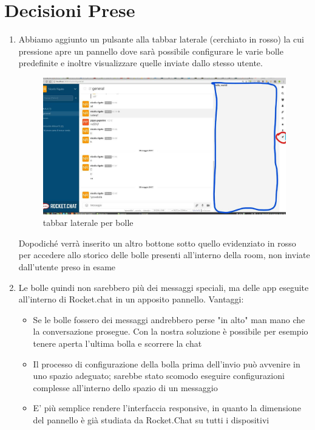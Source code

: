 \documentclass[10 pt,a4paper, openany]{article}
\begin{document}
\section{Decisioni Prese}
\begin{enumerate}
	\item Abbiamo aggiunto un pulsante alla tabbar laterale (cerchiato in rosso) la cui pressione apre un pannello dove sarà possibile configurare le varie bolle predefinite e inoltre visualizzare quelle inviate dallo stesso utente.
	\FloatBarrier
	\begin{figure}[ht]
		\centering
		\includegraphics[scale=0.45]{img/es.png}
		\caption{tabbar laterale per bolle}
	\end{figure}
	

	
	Dopodiché verrà inserito un altro bottone sotto quello evidenziato in rosso per accedere allo storico delle bolle presenti all'interno della room, non inviate dall'utente preso in esame
	
	\item Le bolle quindi non sarebbero più dei messaggi speciali, ma delle app eseguite all'interno di Rocket.chat in un apposito pannello.
	Vantaggi:
	\begin{itemize}
		\item Se le bolle fossero dei messaggi andrebbero perse "in alto" man mano che la conversazione prosegue. Con la nostra soluzione è possibile per esempio tenere aperta l'ultima bolla e scorrere la chat
		\item  Il processo di configurazione della bolla prima dell'invio può avvenire in uno spazio adeguato;
		sarebbe stato scomodo eseguire configurazioni complesse all'interno dello spazio di un messaggio
		\item E' più semplice rendere l'interfaccia responsive, in quanto la dimensione del pannello
		è già studiata da Rocket.Chat su tutti i dispositivi
		
	\end{itemize}
	

	
\end{enumerate}
\end{document}
